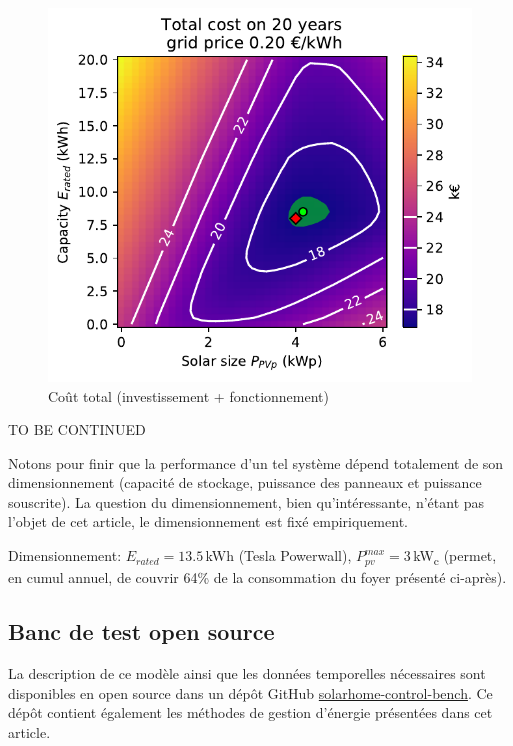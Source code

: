 \documentclass[a4paper,10pt,twocolumn]{article}
\begin{document}
\begin{figure}[!ht]
  \begin{center}
	  \includegraphics[width=0.8\columnwidth]{figures/Total_cost_map_grid020.pdf}
  \end{center}

  \caption{Coût total (investissement + fonctionnement)
  }
  \label{fig:cost_tot}
\end{figure}



TO BE CONTINUED

Notons pour finir que la performance d'un tel système dépend totalement de son dimensionnement
(capacité de stockage, puissance des panneaux et  puissance souscrite).
La question du dimensionnement, bien qu'intéressante, n'étant pas l'objet de cet article,
le dimensionnement est fixé empiriquement.

Dimensionnement: $E_{rated}=13.5\,$kWh (Tesla Powerwall), $P_{pv}^{max}=3\,$kW\textsubscript{c} (permet, en cumul annuel, de couvrir 64\% de la consommation du foyer présenté ci-après).

\subsection{Banc de test open source}

La description de ce modèle ainsi que les données temporelles nécessaires sont
disponibles en open source dans un dépôt GitHub \href{https://github.com/pierre-haessig/solarhome-control-bench}{solarhome-control-bench}.
Ce dépôt contient également les méthodes de gestion d'énergie présentées dans cet article.
\end{document}
